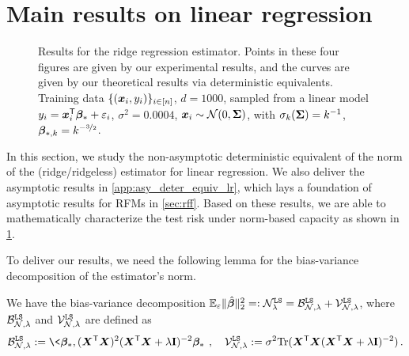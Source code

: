 \section{Main results on linear regression}
\label{sec:linear}


\begin{figure*}[t]
    \centering
    \label{fig:linear_regression_risk_vs_norm_1}
    \label{fig:linear_regression_risk_vs_norm_2}
    \label{fig:linear_regression_risk_vs_norm_3}
    \label{fig:linear_regression_risk_vs_norm_4}
    \caption{Results for the ridge regression estimator. Points in these four figures are given by our experimental results, and the curves are given by our theoretical results via deterministic equivalents. Training data \(\{({\boldsymbol x}_i, y_i)\}_{i \in [n]}\), \(d = 1000\), sampled from a linear model \(y_i = {\boldsymbol x}_i^{\mathsf T} {\boldsymbol \beta}_* + \varepsilon_i\), \(\sigma^2 = 0.0004\), \({\boldsymbol x}_i \sim \mathcal{N}(0, {\boldsymbol \Sigma})\), with \(\sigma_k({\boldsymbol \Sigma})=k^{-1}\), \({\boldsymbol \beta}_{*,k}=k^{-\nicefrac{3}{2}}\).} 
    \label{fig:linear_regression_risk_vs_norm}
\end{figure*}

In this section, we study the non-asymptotic deterministic equivalent of the norm of the (ridge/ridgeless) estimator for linear regression. 
We also deliver the asymptotic results in \cref{app:asy_deter_equiv_lr}, which lays a foundation of asymptotic results for RFMs in \cref{sec:rff}.
Based on these results, we are able to mathematically characterize the test risk under norm-based capacity as shown in \cref{fig:linear_regression_risk_vs_norm}.

To deliver our results, we need the following lemma for the bias-variance decomposition of the estimator's norm.
\begin{lemma}
\label{lemma:biasvariance}
We have the bias-variance decomposition $\mathbb{E}_{\varepsilon}\|\hat{{\boldsymbol \beta}}\|_2^2 =: \mathcal{N}_{\lambda}^{\tt LS} = \mathcal{B}^{\tt LS}_{\mathcal{N},\lambda} + \mathcal{V}^{\tt LS}_{\mathcal{N},\lambda}$, where $\mathcal{B}^{\tt LS}_{\mathcal{N},\lambda}$ and $\mathcal{V}^{\tt LS}_{\mathcal{N},\lambda}$ are defined as 
\[
\begin{aligned}
    \mathcal{B}^{\tt LS}_{\mathcal{N},\lambda} := \<\bbeta_*, (\bX^\sT\bX)^2(\bX^\sT\bX + \lambda\id)^{-2}\bbeta_*\>\,, \quad \mathcal{V}^{\tt LS}_{\mathcal{N},\lambda} := \sigma^2\Tr(\bX^\sT\bX(\bX^\sT\bX + \lambda\id)^{-2})\,.
\end{aligned}
\]
\end{lemma}


